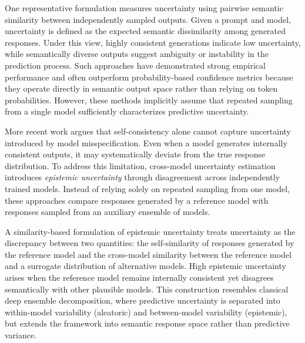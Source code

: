 One representative formulation measures uncertainty using pairwise semantic similarity between independently sampled outputs. Given a prompt and model, uncertainty is defined as the expected semantic dissimilarity among generated responses. Under this view, highly consistent generations indicate low uncertainty, while semantically diverse outputs suggest ambiguity or instability in the prediction process. Such approaches have demonstrated strong empirical performance and often outperform probability-based confidence metrics because they operate directly in semantic output space rather than relying on token probabilities. However, these methods implicitly assume that repeated sampling from a single model sufficiently characterizes predictive uncertainty.

More recent work argues that self-consistency alone cannot capture uncertainty introduced by model misspecification. Even when a model generates internally consistent outputs, it may systematically deviate from the true response distribution. To address this limitation, cross-model uncertainty estimation introduces \emph{epistemic uncertainty} through disagreement across independently trained models. Instead of relying solely on repeated sampling from one model, these approaches compare responses generated by a reference model with responses sampled from an auxiliary ensemble of models.

A similarity-based formulation of epistemic uncertainty treats uncertainty as the discrepancy between two quantities: the self-similarity of responses generated by the reference model and the cross-model similarity between the reference model and a surrogate distribution of alternative models. High epistemic uncertainty arises when the reference model remains internally consistent yet disagrees semantically with other plausible models. This construction resembles classical deep ensemble decomposition, where predictive uncertainty is separated into within-model variability (aleatoric) and between-model variability (epistemic), but extends the framework into semantic response space rather than predictive variance.

